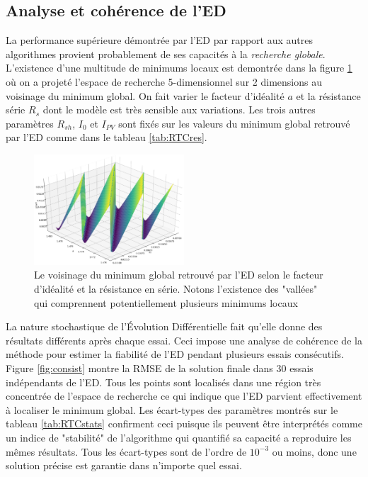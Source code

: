 \subsection{Analyse et cohérence de l'ED}

La performance supérieure démontrée par l'ED par rapport aux autres algorithmes provient probablement de ses capacités à la \textit{recherche globale}. L'existence d'une multitude de minimums locaux est demontrée dans la figure \ref{fig:neigh} où on a projeté l'espace de recherche 5-dimensionnel sur 2 dimensions au voisinage du minimum global. On fait varier le facteur d'idéalité $a$ et la résistance série $R_s$ dont le modèle est très sensible aux variations. Les trois autres paramètres $R_{sh}$, $I_0$ et $I_{PV}$ sont fixés sur les valeurs du minimum global retrouvé par l'ED comme dans le tableau \ref{tab:RTCres}.

\begin{figure}[H]
  \begin{center}
    \includegraphics[width=0.5\textwidth]{resources/RTCFrance/singled/neighborhood.png}
    \caption{Le voisinage du minimum global retrouvé par l'ED selon le facteur d'idéalité et la résistance en série. Notons l'existence des "vallées" qui comprennent potentiellement plusieurs minimums locaux}
    \label{fig:neigh}
  \end{center}
\end{figure}

La nature stochastique de l'Évolution Différentielle fait qu'elle donne des résultats différents après chaque essai. Ceci impose une analyse de cohérence de la méthode pour estimer la fiabilité de l'ED pendant plusieurs essais consécutifs. Figure \ref{fig:consist} montre la RMSE de la solution finale dans 30 essais indépendants de l'ED.
Tous les points sont localisés dans une région très concentrée de l'espace de recherche ce qui indique que l'ED parvient effectivement à localiser le minimum global.
Les écart-types des paramètres montrés sur le tableau \ref{tab:RTCstats} confirment ceci puisque ils peuvent être interprétés comme un indice de "stabilité" de l'algorithme qui quantifié sa capacité a reproduire les mêmes résultats. Tous les écart-types sont de l'ordre de $10^{-3}$ ou moins, donc une solution précise est garantie dans n'importe quel essai.

